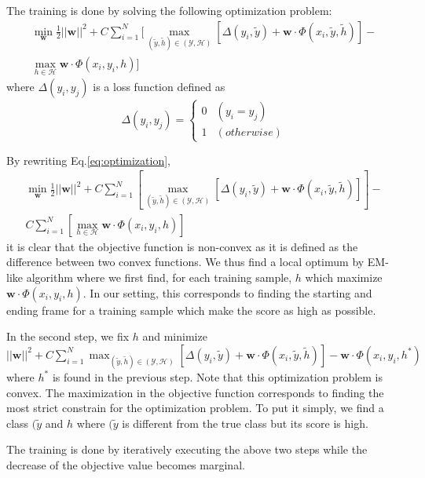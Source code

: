 \documentclass[10pt,twocolumn,letterpaper]{article}
\begin{document}
The training is done by solving the following optimization problem:
\begin{equation}\label{eq:optimization}
\begin{aligned}
\min_{\mathbf{w}} \frac{1}{2} ||\mathbf{w} ||^2 + C \sum_{i=1}^{N} [ \max_{ (\tilde{y},\tilde{h}) \in (\mathcal{Y},\mathcal{H}) } [ \Delta(y_i, \tilde{y}) + \mathbf{w} \cdot \Phi(x_i, \tilde{y}, \tilde{h} )] - \\
\max_{h \in \mathcal{H}}  \mathbf{w} \cdot \Phi(x_i,y_i, h)]
\end{aligned}
\end{equation}
where $\Delta(y_i,y_j)$  is a loss function defined as
\[
  \Delta(y_i,y_j) = \begin{cases}
    0 & (y_i = y_j ) \\
    1 & (otherwise)
  \end{cases}
\]

By rewriting Eq.\ref{eq:optimization},
\begin{align*}\label{eq:optimization}
\min_{\mathbf{w}} \frac{1}{2} ||\mathbf{w} ||^2 + C \sum_{i=1}^{N} [ \max_{ (\tilde{y},\tilde{h}) \in (\mathcal{Y},\mathcal{H}) } [ \Delta(y_i, \tilde{y}) + \mathbf{w} \cdot \Phi(x_i, \tilde{y}, \tilde{h} )]] - \\
C \sum_{i=1}^{N} [ \max_{h \in \mathcal{H}}  \mathbf{w} \cdot \Phi(x_i,y_i, h)]
\end{align*}
it is clear that the objective function is non-convex as it is defined as the difference between two convex functions. We thus find a local optimum by EM-like algorithm where we first find, for each training sample, $h$ which maximize $\mathbf{w} \cdot \Phi(x_i,y_i, h)$. In our setting, this corresponds to finding the starting and ending frame for a training sample which make the score as high as possible.

In the second step, we fix $h$ and minimize $||\mathbf{w} ||^2 + C \sum_{i=1}^{N} \max_{ (\tilde{y},\tilde{h}) \in (\mathcal{Y},\mathcal{H}) } [ \Delta(y_i, \tilde{y}) + \mathbf{w} \cdot \Phi(x_i, \tilde{y}, \tilde{h} )] - \mathbf{w} \cdot \Phi(x_i,y_i,h^*)$ where $h^*$ is found in the previous step. Note that this optimization problem is convex. The maximization in the objective function corresponds to finding the most strict constrain for the optimization problem. To put it simply, we find a class $(\tilde{y}$ and $h$ where $(\tilde{y}$ is different from the true class but its score is high. 

The training is done by iteratively executing the above two steps while the decrease of the objective value becomes marginal. 
\end{document}
